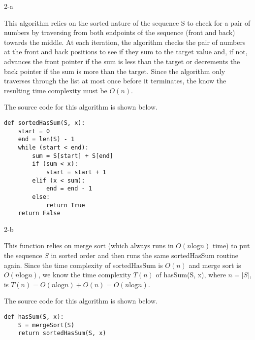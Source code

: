 \documentclass[11pt]{article}
\newcommand{\tlog}{\text{log}}
\begin{document}
\begin{prob}{2-a}
\end{prob}
\begin{sol}
This algorithm relies on the sorted nature of the sequence S to check for a pair of numbers by traversing from both endpoints of the sequence (front and back) towards the middle. At each iteration, the algorithm checks the pair of numbers at the front and back positions to see if they sum to the target value and, if not, advances the front pointer if the sum is less than the target or decrements the back pointer if the sum is more than the target. Since the algorithm only traverses through the list at most once before it terminates, the know the resulting time complexity must be $O(n)$.

The source code for this algorithm is shown below.
\begin{lstlisting}
def sortedHasSum(S, x):
	start = 0
	end = len(S) - 1
	while (start < end):
		sum = S[start] + S[end]
		if (sum < x):
			start = start + 1
		elif (x < sum):
			end = end - 1
		else:
			return True
	return False
\end{lstlisting}
\end{sol}

\begin{prob}{2-b}
\end{prob}
\begin{sol}
This function relies on merge sort (which always runs in $O(n\tlog n)$ time) to put the sequence $S$ in sorted order and then runs the same sortedHasSum routine again. Since the time complexity of sortedHasSum is $O(n)$ and merge sort is $O(n\tlog n)$, we know the time complexity $T(n)$ of hasSum(S, x), where $n = |S|$, is $T(n) = O(n\tlog n) + O(n) = O(n\tlog n)$. 

The source code for this algorithm is shown below.

\begin{lstlisting}
def hasSum(S, x):
	S = mergeSort(S)
	return sortedHasSum(S, x)
\end{lstlisting}
\end{sol}
\end{document}
